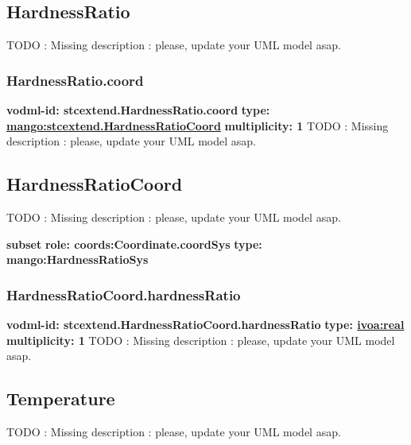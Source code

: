   \subsection{HardnessRatio}
  \label{sect:stcextend.HardnessRatio}
    TODO : Missing description : please, update your UML model asap.

    \subsubsection{HardnessRatio.coord}
      \textbf{vodml-id: stcextend.HardnessRatio.coord} \newline
      \textbf{type: \hyperref[sect:stcextend.HardnessRatioCoord]{mango:stcextend.HardnessRatioCoord}} \newline
      \textbf{multiplicity: 1} \newline 
      TODO : Missing description : please, update your UML model asap.

  \subsection{HardnessRatioCoord}
  \label{sect:stcextend.HardnessRatioCoord}
    TODO : Missing description : please, update your UML model asap.

    \noindent \textbf{subset} \newline
    \indent   \textbf{role: coords:Coordinate.coordSys} \newline
    \indent   \textbf{type: mango:HardnessRatioSys} \newline


    \subsubsection{HardnessRatioCoord.hardnessRatio}
      \textbf{vodml-id: stcextend.HardnessRatioCoord.hardnessRatio} \newline
      \textbf{type: \hyperref[sect:ivoa]{ivoa:real}} \newline
      \textbf{multiplicity: 1} \newline 
      TODO : Missing description : please, update your UML model asap.



  \subsection{Temperature}
  \label{sect:Temperature}
    TODO : Missing description : please, update your UML model asap.

